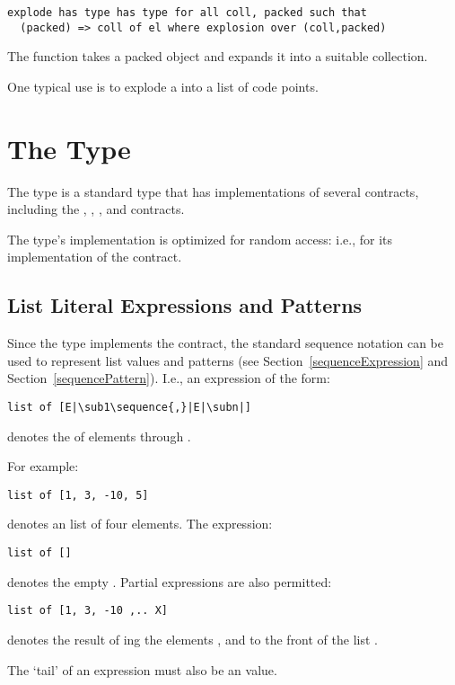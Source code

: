 \begin{lstlisting}
explode has type has type for all coll, packed such that 
  (packed) => coll of el where explosion over (coll,packed) 
\end{lstlisting}

\noindent
The  function takes a packed object and expands it into a suitable collection.

\begin{aside}
One typical use is to explode a  into a  list of  code points.\end{aside}

\section{The  Type}
\label{arrayType}
The  type is a standard type that has implementations of several contracts, including the , , ,  and  contracts.

The  type's implementation is optimized for random access: i.e., for its implementation of the  contract.

\subsection{List Literal Expressions and Patterns}
\label{listLiteral}
Since the  type implements the  contract, the standard sequence notation can be used to represent list values and patterns (see Section~\vref{sequenceExpression} and Section~\vref{sequencePattern}). I.e., an expression of the form:
\begin{lstlisting}[escapechar=|]
list of [E|\sub1\sequence{,}|E|\subn|]
\end{lstlisting}
denotes the  of elements  through .

For example:
\begin{lstlisting}
list of [1, 3, -10, 5]
\end{lstlisting}
denotes an list of four  elements. The expression:
\begin{lstlisting}
list of []
\end{lstlisting}
denotes the empty . Partial  expressions are also permitted:
\begin{lstlisting}
list of [1, 3, -10 ,.. X]
\end{lstlisting}
denotes the result of ing the elements ,  and  to the front of the list .
\begin{aside}
The `tail' of an  expression must also be an  value.
\end{aside}

